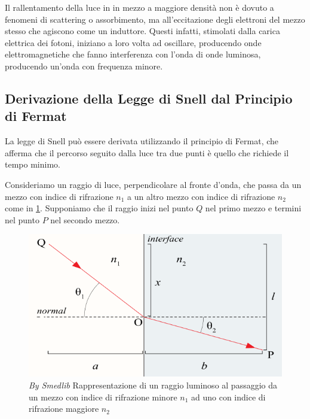 \documentclass[12pt,a4paper]{report}
\begin{document}
Il rallentamento della luce in in mezzo a maggiore densità non è dovuto a fenomeni di scattering o assorbimento, ma all'eccitazione degli elettroni del mezzo stesso che agiscono come un induttore. Questi infatti, stimolati dalla carica elettrica dei fotoni, iniziano a loro volta ad oscillare, producendo onde elettromagnetiche che fanno interferenza con l'onda di onde luminosa, producendo un'onda con frequenza minore\cite{Fermilab2019}.

\subsection{Derivazione della Legge di Snell dal Principio di Fermat}

La legge di Snell può essere derivata utilizzando il principio di Fermat, che afferma che il percorso seguito dalla luce tra due punti è quello che richiede il tempo minimo.

Consideriamo un raggio di luce, perpendicolare al fronte d'onda, che passa da un mezzo con indice di rifrazione \( n_1 \) a un altro mezzo con indice di rifrazione \( n_2 \) come in \cref{fig:snellsLaw}. Supponiamo che il raggio inizi nel punto \( Q \) nel primo mezzo e termini nel punto \( P \) nel secondo mezzo.

\begin{figure}[!ht]
    \centering
    \includegraphics[width=\linewidth]{Immagini/Snells_law_Diagram_B_vector.png}
    \captionsetup{width=.8\linewidth}
    \caption[\textit{By Oleg Alexandrov}]{\textit{By Smedlib\footnotemark} Rappresentazione di un raggio luminoso al passaggio da un mezzo con indice di rifrazione minore \( n_1 \) ad uno con indice di rifrazione maggiore \( n_2 \)}
    \label{fig:snellsLaw}
\end{figure}
\end{document}
